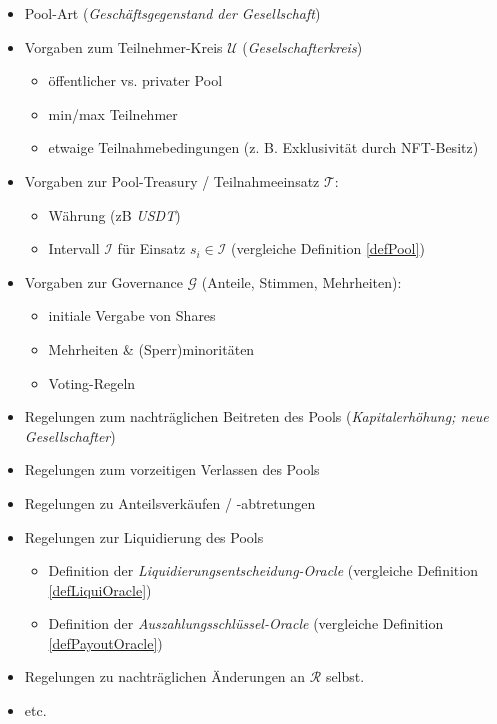\begin{itemize}
  \item Pool-Art (\textit{Geschäftsgegenstand der Gesellschaft})
  \item Vorgaben zum Teilnehmer-Kreis $\mathcal{U}$ (\textit{Geselschafterkreis})
  \begin{itemize}
	\item öffentlicher vs. privater Pool
	\item min/max Teilnehmer
	\item etwaige Teilnahmebedingungen (z. B. Exklusivität durch NFT-Besitz)
  \end{itemize}
  \item Vorgaben zur Pool-Treasury / Teilnahmeeinsatz $\mathcal{T}$:
  \begin{itemize}
  	\item Währung (zB \textit{USDT})
  	\item Intervall $\mathcal{I}$ für Einsatz $s_i \in \mathcal{I}$ (vergleiche Definition \ref{defPool})
  \end{itemize}
  \item Vorgaben zur Governance $\mathcal{G}$ (Anteile, Stimmen, Mehrheiten):
  \begin{itemize}
  	\item initiale Vergabe von Shares
  	\item Mehrheiten \& (Sperr)minoritäten
	\item Voting-Regeln
  \end{itemize}  
  \item Regelungen zum nachträglichen Beitreten des Pools (\textit{Kapitalerhöhung; neue Gesell\-schafter})
  \item Regelungen zum vorzeitigen Verlassen des Pools
  \item Regelungen zu Anteilsverkäufen / -abtretungen
  \item Regelungen zur Liquidierung des Pools
  \begin{itemize}
	\item Definition der \textit{Liquidierungsentscheidung-Oracle} (vergleiche Definition \ref{defLiquiOracle})
	\item Definition der \textit{Auszahlungsschlüssel-Oracle} (vergleiche Definition \ref{defPayoutOracle})
  \end{itemize}
  \item Regelungen zu nachträglichen Änderungen an $\mathcal{R}$ selbst.
  \item etc.
\end{itemize}

\vspace{0.5cm}

